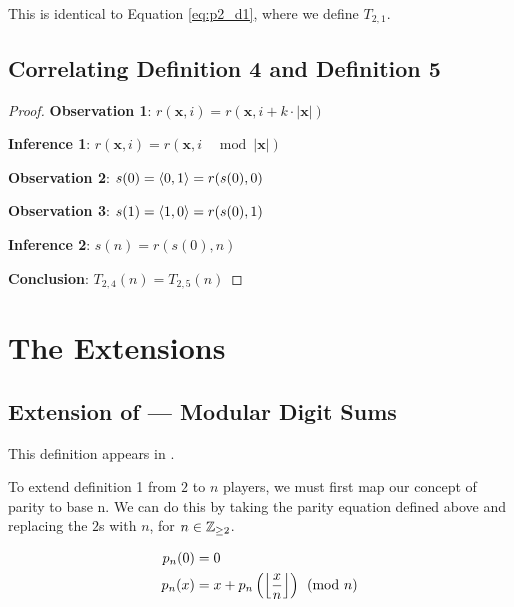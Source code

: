 \documentclass[conference]{IEEEtran}
\begin{document}
This is identical to Equation \ref{eq:p2_d1}, where we define $T_{2,1}$.

\subsection{Correlating Definition 4 and Definition 5}

\begin{proof}
\par\noindent\par
    \textbf{Observation 1}: $r(\textbf{x}, i) = r(\textbf{x}, i + k \cdot |\textbf{x}|)$

    \textbf{Inference 1}: $r(\textbf{x}, i) = r(\textbf{x}, i \;\; \mod{|\textbf{x}|})$

    \textbf{Observation 2}: $s(0) = \langle 0, 1 \rangle = r(s(0), 0)$

    \textbf{Observation 3}: $s(1) = \langle 1, 0 \rangle = r(s(0), 1)$

    \textbf{Inference 2}: $s(n) = r(s(0), n)$


    \textbf{Conclusion}: $T_{2,4}(n) = T_{2,5}(n)$
\end{proof}

\section{The Extensions}

\subsection{Extension  of \TotalExtensions\xspace --- Modular Digit Sums}

This definition appears in \cite{Astudillo_2003, Dekking_2023, OEIS-TMS-3-2}.

To extend definition 1 from $2$ to $n$ players, we must first map our concept of parity to base n. We can do this by taking the parity equation defined above and replacing the $2$s with $n$, for $n \in \mathbb{Z}_{\ge 2}$.

\begin{equation}
    \begin{aligned}
p_n(0) &= 0 \\
p_n(x) &= x + p_n\left(\left\lfloor \dfrac{x}{n} \right\rfloor\right) \pmod{n}
    \end{aligned}
\end{equation}
\end{document}
